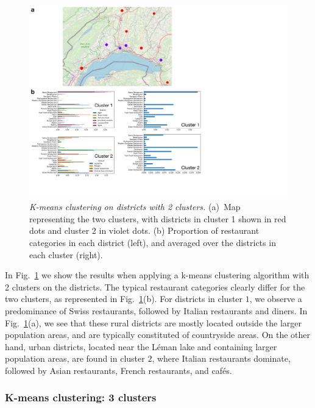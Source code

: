 \documentclass[12pt]{article}
\begin{document}
\begin{figure}
\begin{center}
\includegraphics[width=\textwidth]{Figures/Fig7}
\caption{\label{fig7} \emph{K-means clustering on districts with 2 clusters.} (a)~Map representing the two clusters, with districts in cluster 1 shown in red dots and cluster 2 in violet dots. (b) Proportion of restaurant categories in each district (left), and averaged over the districts in each cluster (right).}
\end{center}
\end{figure}

In Fig.~\ref{fig7} we show the results when applying a k-means clustering algorithm with 2 clusters on the districts. The typical restaurant categories clearly differ for the two clusters, as represented in Fig.~\ref{fig7}(b). For districts in cluster $1$, we observe a predominance of Swiss restaurants, followed by Italian restaurants and diners. In Fig.~\ref{fig7}(a), we see that these rural districts are mostly located outside the larger population areas, and are typically constituted of countryside areas. On the other hand, urban districts, located near the L\'eman lake and containing larger population areas, are found in cluster $2$, where Italian restaurants dominate, followed by Asian restaurants, French restaurants, and caf\'es. 

\subsubsection{K-means clustering: 3 clusters}
\end{document}
